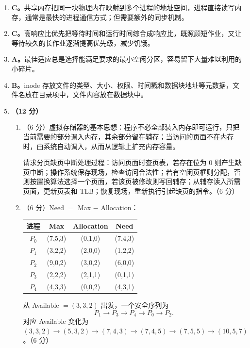 \documentclass[a4paper,11pt]{article}
\begin{document}
\begin{enumerate}[start=8, label=\textbf{\arabic*.}, leftmargin=2.4em, itemsep=0.45em]

\item \textbf{C。}共享内存把同一块物理内存映射到多个进程的地址空间，进程直接读写内存，通常是最快的进程通信方式；但需要额外的同步机制。

\item \textbf{C。}高响应比优先把等待时间和运行时间综合成响应比，既照顾短作业，又让等待较久的长作业逐渐提高优先级，减少饥饿。

\item \textbf{A。}最佳适应总是选择能满足要求的最小空闲分区，容易留下大量难以利用的小碎片。

\item \textbf{B。}inode 存放文件的类型、大小、权限、时间戳和数据块地址等元数据，文件名放在目录项中，文件内容放在数据块中。

\item \textbf{（12 分）}
\begin{enumerate}[label=（\arabic*）, leftmargin=2.2em, itemsep=2pt]
  \item （6 分）虚拟存储器的基本思想：程序不必全部装入内存即可运行，只把当前需要的部分调入内存，其余部分留在辅存；当访问的页面不在内存时，由系统自动调入，从而从逻辑上扩充内存容量。
  
  请求分页缺页中断处理过程：访问页面时查页表，若存在位为 0 则产生缺页中断；操作系统保存现场，检查访问合法性；若有空闲页框则分配，否则按置换算法选择一个页面，若该页被修改则写回辅存；从辅存读入所需页面，更新页表和 TLB；恢复现场，重新执行引起缺页的指令。\hfill（6 分）

  \item （6 分）Need $=$ Max $-$ Allocation：
  \begin{center}\small
  \begin{tabular}{cccc}
  \toprule
  进程 & Max & Allocation & Need \\
  \midrule
  $P_0$ & (7,5,3) & (0,1,0) & (7,4,3) \\
  $P_1$ & (3,2,2) & (2,0,0) & (1,2,2) \\
  $P_2$ & (9,0,2) & (3,0,2) & (6,0,0) \\
  $P_3$ & (2,2,2) & (2,1,1) & (0,1,1) \\
  $P_4$ & (4,3,3) & (0,0,2) & (4,3,1) \\
  \bottomrule
  \end{tabular}
  \end{center}
  从 Available $=(3,3,2)$ 出发，一个安全序列为
  \[
  P_1\to P_3\to P_4\to P_0\to P_2.
  \]
  对应 Available 变化为 $(3,3,2)\to(5,3,2)\to(7,4,3)\to(7,4,5)\to(7,5,5)\to(10,5,7)$。\hfill（6 分）
\end{enumerate}

\end{enumerate}
\end{document}
